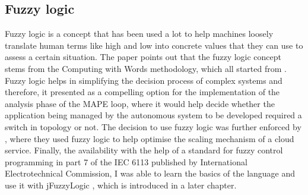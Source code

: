 \subsection{Fuzzy logic}
Fuzzy logic is a concept that has been used a lot to help machines loosely translate human terms like high and low into concrete values that they can use to assess a certain situation. The paper \cite{zadeh1996fuzzy} points out that  the fuzzy logic concept stems from the Computing with Words methodology, which all started from \cite{zadeh1973outline}. Fuzzy logic helps in simplifying the decision process of complex systems and therefore, it presented as a compelling option for the implementation of the analysis phase of the MAPE loop, where it would help decide whether the application being managed by the autonomous system to be developed required a switch in topology or not. The decision to use fuzzy logic was further enforced by \cite{frey2014cloud}, where they used fuzzy logic to help optimise the scaling mechanism of a cloud service. Finally, the availability with the help of a standard for fuzzy control programming in part 7 of the IEC 6113 published by International Electrotechnical Commission, I was able to learn the basics of the language and use it with jFuzzyLogic \cite{cingolani2013jfuzzylogic}, which is introduced in a later chapter.  

